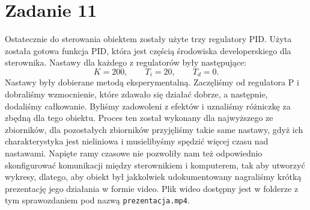 \chapter{Zadanie 11}
Ostatecznie do sterowania obiektem zostały użyte trzy regulatory PID.
Użyta została gotowa funkcja PID, która jest częścią środowiska developerskiego
dla sterownika. Nastawy dla każdego z regulatorów były następujące:
\begin{equation}
  K = 200, \qquad T_i = 20, \qquad T_d = 0.
\end{equation}
Nastawy były dobierane metodą eksperymentalną. Zaczęliśmy od regulatora
P i dobraliśmy wzmocnienie, które zdawało się działać dobrze, a następnie,
dodaliśmy całkowanie. Byliśmy zadowoleni z efektów i uznaliśmy różniczkę za
zbędną dla tego obiektu. Proces ten został wykonany dla najwyższego ze
zbiorników, dla pozostałych zbiorników przyjęliśmy takie same nastawy,
gdyż ich charakterystyka jest nieliniowa i musielibyśmy spędzić więcej
czasu nad nastawami. Napięte ramy czasowe nie pozwoliły nam też odpowiednio
skonfigurować komunikacji między sterownikiem i komputerem, tak aby utworzyć
wykresy, dlatego, aby obiekt był jakkolwiek udokumentowany nagraliśmy krótką
prezentację jego działania w formie video. Plik wideo dostępny jest w folderze
z tym sprawozdaniem pod nazwą \texttt{prezentacja.mp4}.
